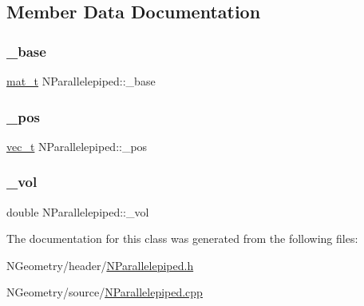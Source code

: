 \subsection{Member Data Documentation}
\mbox{\label{class_n_parallelepiped_a02542ae7d5e1d052412eb06a292e0e9d}} 
\subsubsection{\texorpdfstring{\_base}{\_base}}
{\footnotesize\ttfamily \mbox{\hyperlink{group___n_algebra_ga44dfb60c1e03b44e98a332fb2ae71947}{mat\+\_\+t}} N\+Parallelepiped\+::\+\_\+base\hspace{0.3cm}{\ttfamily [protected]}}

\mbox{\label{class_n_parallelepiped_ae1cc22beb853095d8a110c641dd8e005}} 
\subsubsection{\texorpdfstring{\_pos}{\_pos}}
{\footnotesize\ttfamily \mbox{\hyperlink{group___n_algebra_ga0a2cfc67e738a3d73e4f12098c4c07f6}{vec\+\_\+t}} N\+Parallelepiped\+::\+\_\+pos\hspace{0.3cm}{\ttfamily [protected]}}

\mbox{\label{class_n_parallelepiped_aabd33c4ffeff864ea342440c08d4702b}} 
\subsubsection{\texorpdfstring{\_vol}{\_vol}}
{\footnotesize\ttfamily double N\+Parallelepiped\+::\+\_\+vol\hspace{0.3cm}{\ttfamily [protected]}}



The documentation for this class was generated from the following files\+:\begin{DoxyCompactItemize}
\item 
N\+Geometry/header/\mbox{\hyperlink{_n_parallelepiped_8h}{N\+Parallelepiped.\+h}}\item 
N\+Geometry/source/\mbox{\hyperlink{_n_parallelepiped_8cpp}{N\+Parallelepiped.\+cpp}}\end{DoxyCompactItemize}
